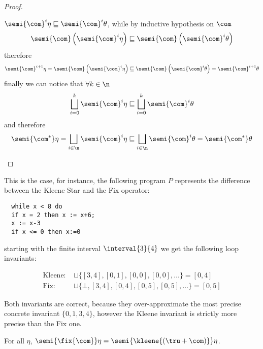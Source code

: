 \begin{proof}
\begin{itemize}
\begin{itemize}
      \(\semi{\com}^{i} \eta \sqsubseteq \semi{\com}^{i} \theta\),
      while by inductive hypothesis on \(\com\)
      \begin{equation*}
        \semi{\com}\left( \semi{\com}^i\eta \right) \sqsubseteq
        \semi{\com}\left( \semi{\com}^i\theta \right)
      \end{equation*}
      therefore
      \begin{equation*}
        \semi{\com}^{i+1} \eta = \semi{\com}\left( \semi{\com}^i\eta \right) \sqsubseteq \semi{\com}\left( \semi{\com}^i\theta \right) = \semi{\com}^{i+1} \theta
      \end{equation*}
      finally we can notice that \(\forall k\in\n\)
      \begin{equation*}
        \bigsqcup_{i=0}^k\semi{\com}^i\eta \sqsubseteq \bigsqcup_{i=0}^k\semi{\com}^i\theta
      \end{equation*}
      and therefore
      \begin{equation*}
        \semi{\com^*}\eta = \bigsqcup_{i\in\n}\semi{\com}^i\eta \sqsubseteq \bigsqcup_{i\in\n}\semi{\com}^i\theta = \semi{\com^*}\theta
      \end{equation*}
    \end{itemize}
  \end{itemize}
\end{proof}

\begin{example} \label{ex:fix}
  This is the case, for instance, the following program \(P\)
  represents the difference between the Kleene Star and the Fix
  operator:
\begin{verbatim}
  while x < 8 do
  if x = 2 then x := x+6;
  x := x-3
  if x <= 0 then x:=0
\end{verbatim}
starting with the finite interval \(\interval{3}{4}\) we get the
following loop invariants:

\begin{align*}
  \text{Kleene: } &\sqcup\{[3,4], [0,1], [0,0], [0,0], \ldots\} = [0,4]\\[5pt]
  \text{Fix: } & \sqcup\{\bot, [3,4], [0,4], [0,5], [0,5],\ldots\} = [0,5]
\end{align*}

\noindent
Both invariants are correct, because they over-approximate the most
precise concrete invariant \(\{0,1,3,4\}\), however the Kleene
invariant is strictly more precise than the Fix one.
\end{example}

\begin{lemma}\label{lemma-ss}
  For all \(\eta\),
  \(\semi{\fix{\com}} \eta = \semi{\kleene{(\tru + \com)}} \eta\).
\end{lemma}

